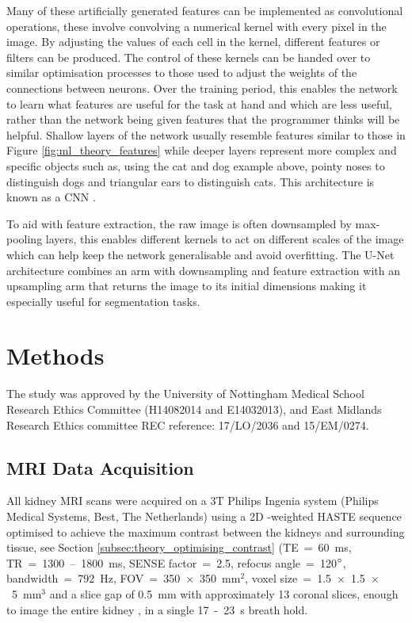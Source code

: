 Many of these artificially generated features can be implemented as convolutional operations, these involve convolving a numerical kernel with every pixel in the image. By adjusting the values of each cell in the kernel, different features or filters can be produced. The control of these kernels can be handed over to similar optimisation processes to those used to adjust the weights of the connections between neurons. Over the training period, this enables the network to learn what features are useful for the task at hand and which are less useful, rather than the network being given features that the programmer thinks will be helpful. Shallow layers of the network usually resemble features similar to those in Figure \ref{fig:ml_theory_features} while deeper layers represent more complex and specific objects such as, using the cat and dog example above, pointy noses to distinguish dogs and triangular ears to distinguish cats. This architecture is known as a \acf{CNN} \cite{fukushima_neocognitron_1988,lecun_gradient-based_1998}. 

To aid with feature extraction, the raw image is often downsampled by max-pooling layers, this enables different kernels to act on different scales of the image which can help keep the network generalisable and avoid overfitting. The U-Net architecture \cite{ronneberger_u-net_2015} combines an arm with downsampling and feature extraction with an upsampling arm that returns the image to its initial dimensions making it especially useful for segmentation tasks.

\section{Methods}
The study was approved by the University of Nottingham Medical School Research Ethics Committee (H14082014 and E14032013), and East Midlands Research Ethics committee REC reference: 17/LO/2036 and 15/EM/0274.

\subsection{MRI Data Acquisition}
\label{sec:ml_methods_acquisition}

All kidney \ac{MRI} scans were acquired on a 3T Philips Ingenia system (Philips Medical Systems, Best, The Netherlands) using a 2D \ttwo-weighted \ac{HASTE} sequence optimised to achieve the maximum contrast between the kidneys and surrounding tissue, see Section \ref{subsec:theory_optimising_contrast} (\ac{TE}~=~60~ms, \ac{TR}~=~1300~–~1800~ms, \ac{SENSE} factor~=~2.5, refocus angle~=~120$\degree$, bandwidth~=~792~Hz, \ac{FOV}~=~350~$\times$~350~mm$^2$, voxel size~=~1.5~$\times$~1.5~$\times$~5~mm$^3$ and a slice gap of 0.5~mm with approximately 13 coronal slices, enough to image the entire kidney \cite{petzold_building_2014, will_automated_2014}, in a single 17~-~23~s breath hold.

